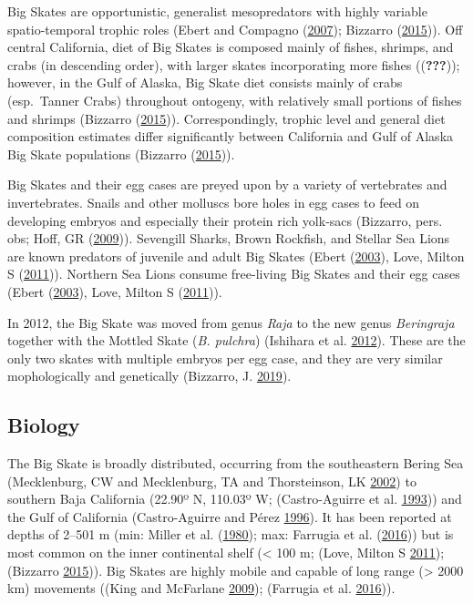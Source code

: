 \documentclass[12pt,]{article}
\begin{document}
Big Skates are opportunistic, generalist mesopredators with highly
variable spatio-temporal trophic roles (Ebert and Compagno
(\protect\hyperlink{ref-Ebert2007}{2007}); Bizzarro
(\protect\hyperlink{ref-Bizzarro2015}{2015})). Off central California,
diet of Big Skates is composed mainly of fishes, shrimps, and crabs (in
descending order), with larger skates incorporating more fishes
(({\textbf{???}})); however, in the Gulf of Alaska, Big Skate diet
consists mainly of crabs (esp.~Tanner Crabs) throughout ontogeny, with
relatively small portions of fishes and shrimps (Bizzarro
(\protect\hyperlink{ref-Bizzarro2015}{2015})). Correspondingly, trophic
level and general diet composition estimates differ significantly
between California and Gulf of Alaska Big Skate populations (Bizzarro
(\protect\hyperlink{ref-Bizzarro2015}{2015})).

Big Skates and their egg cases are preyed upon by a variety of
vertebrates and invertebrates. Snails and other molluscs bore holes in
egg cases to feed on developing embryos and especially their protein
rich yolk-sacs (Bizzarro, pers. obs; Hoff, GR
(\protect\hyperlink{ref-Hoff2009}{2009})). Sevengill Sharks, Brown
Rockfish, and Stellar Sea Lions are known predators of juvenile and
adult Big Skates (Ebert (\protect\hyperlink{ref-Ebert2003}{2003}), Love,
Milton S (\protect\hyperlink{ref-Love2011}{2011})). Northern Sea Lions
consume free-living Big Skates and their egg cases (Ebert
(\protect\hyperlink{ref-Ebert2003}{2003}), Love, Milton S
(\protect\hyperlink{ref-Love2011}{2011})).

In 2012, the Big Skate was moved from genus \emph{Raja} to the new genus
\emph{Beringraja} together with the Mottled Skate (\emph{B. pulchra})
(Ishihara et al. \protect\hyperlink{ref-Ishihara2012}{2012}). These are
the only two skates with multiple embryos per egg case, and they are
very similar mophologically and genetically (Bizzarro, J.
\protect\hyperlink{ref-Bizzarro2019}{2019}).

\hypertarget{biology}{%
\subsection{Biology}\label{biology}}

The Big Skate is broadly distributed, occurring from the southeastern
Bering Sea (Mecklenburg, CW and Mecklenburg, TA and Thorsteinson, LK
\protect\hyperlink{ref-Mecklenburg2002}{2002}) to southern Baja
California (22.90º N, 110.03º W; (Castro-Aguirre et al.
\protect\hyperlink{ref-Castro1993}{1993})) and the Gulf of California
(Castro-Aguirre and Pérez \protect\hyperlink{ref-Castro1996}{1996}). It
has been reported at depths of 2--501 m (min: Miller et al.
(\protect\hyperlink{ref-Miller1980}{1980}); max: Farrugia et al.
(\protect\hyperlink{ref-Farrugia2016}{2016})) but is most common on the
inner continental shelf (\textless{} 100 m; (Love, Milton S
\protect\hyperlink{ref-Love2011}{2011}); (Bizzarro
\protect\hyperlink{ref-Bizzarro2015}{2015})). Big Skates are highly
mobile and capable of long range (\textgreater{} 2000 km) movements
((King and McFarlane \protect\hyperlink{ref-KingandMcF2009}{2009});
(Farrugia et al. \protect\hyperlink{ref-Farrugia2016}{2016})).
\end{document}
